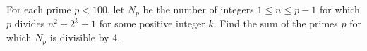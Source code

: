 For each prime $p<100$, let $N_p$ be the number of integers $1\le n\le p-1$ for which $p$ divides $n^2+2^k+1$ for some positive integer $k$. Find the sum of the primes $p$ for which $N_p$ is divisible by 4.

